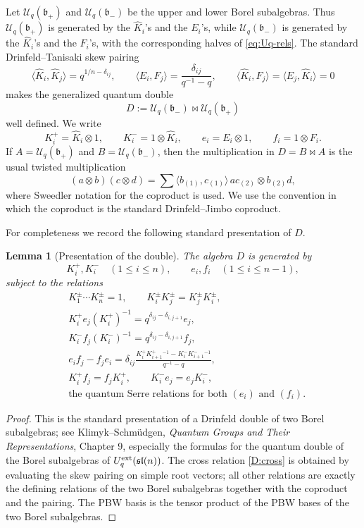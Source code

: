 \documentclass[11pt]{article}
\newcommand{\Uc}{\mathcal U}
\newcommand{\fb}{\mathfrak b}
\newcommand{\sl}{\mathfrak{sl}}
\newcommand{\bipr}{\bowtie}
\newcommand{\la}{\langle}
\newcommand{\ra}{\rangle}
\newtheorem{lemma}[theorem]{Lemma}
\theoremstyle{definition}
\theoremstyle{remark}
\begin{document}
Let \(\Uc_q(\fb_+)\) and \(\Uc_q(\fb_-)\) be the upper and lower Borel
subalgebras.  Thus \(\Uc_q(\fb_+)\) is generated by the \(\hat K_i\)'s and the
\(E_i\)'s, while \(\Uc_q(\fb_-)\) is generated by the \(\hat K_i\)'s and the
\(F_i\)'s, with the corresponding halves of \eqref{eq:Uq-rels}.  The standard
Drinfeld--Tanisaki skew pairing
\[
\la \hat K_i,\hat K_j\ra=q^{1/n-\delta_{ij}},\qquad
\la E_i,F_j\ra=\frac{\delta_{ij}}{q^{-1}-q},\qquad
\la \hat K_i,F_j\ra=\la E_j,\hat K_i\ra=0
\]
makes the generalized quantum double
\[
D:=\Uc_q(\fb_-)\bipr \Uc_q(\fb_+)
\]
well defined.  We write
\[
K_i^+=\hat K_i\otimes 1,\qquad K_i^-=1\otimes \hat K_i,\qquad
e_i=E_i\otimes 1,\qquad f_i=1\otimes F_i .
\]
If \(A=\Uc_q(\fb_+)\) and \(B=\Uc_q(\fb_-)\), then the multiplication in
\(D=B\bipr A\) is the usual twisted multiplication
\[
(a\otimes b)(c\otimes d)
=\sum \la b_{(1)},c_{(1)}\ra\, ac_{(2)}\otimes b_{(2)}d,
\]
where Sweedler notation for the coproduct is used.  We use the convention in
which the coproduct is the standard Drinfeld--Jimbo coproduct.

For completeness we record the following standard presentation of \(D\).

\begin{lemma}[Presentation of the double]\label{lem:D-presentation}
The algebra \(D\) is generated by
\[
K_i^+,K_i^-\quad (1\le i\le n),\qquad e_i,f_i\quad (1\le i\le n-1),
\]
subject to the relations
\begin{align}
&K_1^\pm\cdots K_n^\pm=1,\qquad K_i^\pm K_j^\pm=K_j^\pm K_i^\pm,
\label{D:cartan}\\
&K_i^+e_j(K_i^+)^{-1}=q^{\delta_{ij}-\delta_{i,j+1}}e_j,
\label{D:e-action}\\
&K_i^- f_j(K_i^-)^{-1}=q^{\delta_{ij}-\delta_{i,j+1}}f_j,
\label{D:f-action}\\
&e_if_j-f_je_i
 =\delta_{ij}\frac{K_i^+K_{i+1}^+{}^{-1}
                   -K_i^-K_{i+1}^-{}^{-1}}{q^{-1}-q},
\label{D:cross}\\
&K_i^+f_j=f_jK_i^+,\qquad K_i^-e_j=e_jK_i^-,
\label{D:commute}\\
&\text{the quantum Serre relations for both }(e_i)\text{ and }(f_i).
\label{D:serre}
\end{align}
\end{lemma}

\begin{proof}
This is the standard presentation of a Drinfeld double of two Borel
subalgebras; see Klimyk--Schm\"udgen, \emph{Quantum Groups and Their
Representations}, Chapter 9, especially the formulas for the quantum double of
the Borel subalgebras of \(U_q^{\rm ext}(\sl(n))\).  The cross relation
\eqref{D:cross} is obtained by evaluating the skew pairing on simple root
vectors; all other relations are exactly the defining relations of the two
Borel subalgebras together with the coproduct and the pairing.  The PBW basis
is the tensor product of the PBW bases of the two Borel subalgebras.
\end{proof}
\end{document}
